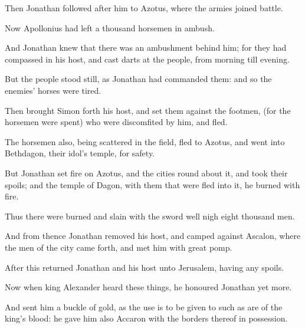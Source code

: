 {\par }{\PP {}Then Jonathan followed after him to Azotus, where the armies joined battle.
\par }{\PP {}Now Apollonius had left a thousand horsemen in ambush.
\par }{\PP {}And Jonathan knew that there was an ambushment behind him; for they had compassed in his host, and cast darts at the people, from morning till evening.
\par }{\PP {}But the people stood still, as Jonathan had commanded them: and so the enemies’ horses were tired.
\par }{\PP {}Then brought Simon forth his host, and set them against the footmen, (for the horsemen were spent) who were discomfited by him, and fled.
\par }{\PP {}The horsemen also, being scattered in the field, fled to Azotus, and went into Bethdagon, their idol’s temple, for safety.
\par }{\PP {}But Jonathan set fire on Azotus, and the cities round about it, and took their spoils; and the temple of Dagon, with them that were fled into it, he burned with fire.
\par }{\PP {}Thus there were burned and slain with the sword well nigh eight thousand men.
\par }{\PP {}And from thence Jonathan removed his host, and camped against Ascalon, where the men of the city came forth, and met him with great pomp.
\par }{\PP {}After this returned Jonathan and his host unto Jerusalem, having any spoils.
\par }{\PP {}Now when king Alexander heard these things, he honoured Jonathan yet more.
\par }{\PP {}And sent him a buckle of gold, as the use is to be given to such as are of the king’s blood: he gave him also Accaron with the borders thereof in possession.

}
